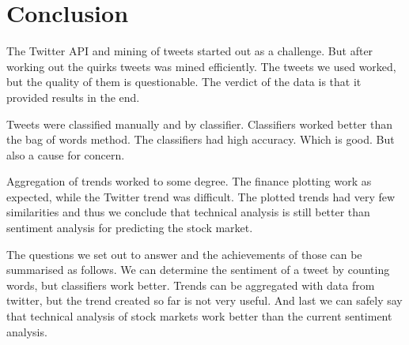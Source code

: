 \chapter{Conclusion}\label{conclusion}

The Twitter API and mining of tweets started out as a challenge. But after
working out the quirks tweets was mined efficiently. The tweets we used worked,
but the quality of them is questionable. The verdict of the data is that it
provided results in the end.    

Tweets were classified manually and by classifier. Classifiers worked better
than the bag of words method. The classifiers had high accuracy. Which is good.
But also a cause for concern. 

Aggregation of trends worked to some degree. The finance plotting work as
expected, while the Twitter trend was difficult. The plotted trends had very
few similarities and thus we conclude that technical analysis is still better
than sentiment analysis for predicting the stock market.  

The questions we set out to answer and the achievements of those can be
summarised as follows. We can determine the sentiment of a tweet by counting
words, but classifiers work better. Trends can be aggregated with data from
twitter, but the trend created so far is not very useful. And last we can safely
say that technical analysis of stock markets work better than the current sentiment analysis. 

